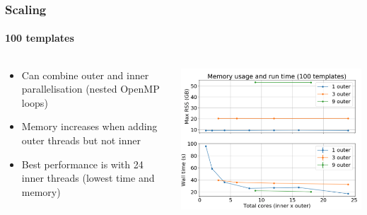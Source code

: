 \documentclass[aspectratio=169]{beamer}
\begin{document}
\begin{frame}[t]
    \frametitle{Scaling}
    \framesubtitle{100 templates}

    \begin{columns}
        \begin{column}{0.4\textwidth}
            \begin{itemize}
              \item Can combine outer and inner parallelisation (nested OpenMP loops)
              \item Memory increases when adding outer threads but not inner
              \item Best performance is with 24 inner threads (lowest time and memory)
            \end{itemize}
        \end{column}
        \begin{column}{0.6\textwidth}
            \includegraphics[width=\textwidth]{images/scaleability-100templates.png}
        \end{column}
    \end{columns}

\end{frame}
\end{document}
